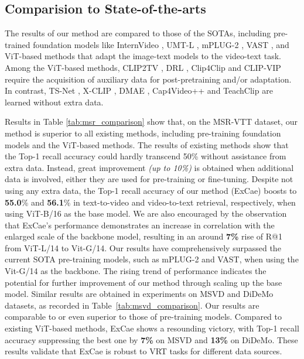 \subsection{Comparision to State-of-the-arts}
The results of our method are compared to those of the SOTAs, including pre-trained foundation models like InternVideo \cite{wang2022internvideo}, UMT-L \cite{li2023unmasked}, mPLUG-2 \cite{xu2023mplug}, VAST \cite{chen2024vast}, and ViT-based methods that adapt the image-text models to the video-text task. Among the ViT-based methods, CLIP2TV \cite{gao2021clip2tv}, DRL \cite{wang2022disentangled}, Clip4Clip \cite{luo2022clip4clip} and CLIP-VIP \cite{xue2022clip} require the acquisition of auxiliary data for post-pretraining and/or adaptation. In contrast, TS-Net \cite{liu2022ts2}, X-CLIP \cite{ma2022x}, DMAE \cite{jiang2023dual}, Cap4Video++ \cite{cap4video++} and TeachClip \cite{holistic} are learned without extra data. 


Results in Table \ref{tab:msr_comparison} show that, on the MSR-VTT dataset, our method is superior to all existing methods, including pre-training foundation models and the ViT-based methods. 
The results of existing methods show that the Top-1 recall accuracy could hardly transcend 50\% without assistance from extra data. Instead, great improvement \textit{(up to 10\%)} is obtained when additional data is involved, either they are used for pre-training or fine-tuning. 
Despite not using any extra data, the Top-1 recall accuracy of our method (ExCae) boosts to \textbf{55.0}\% and \textbf{56.1}\% in text-to-video and video-to-text retrieval, respectively, when using ViT-B/16 as the base model.
We are also encouraged by the observation that ExCae's performance demonstrates an increase in correlation with the enlarged scale of the backbone model, resulting in an around \textbf{7\%} rise of R@1 from ViT-L/14 to Vit-G/14. Our results have comprehensively surpassed the current SOTA pre-training models, such as mPLUG-2 and VAST, when using the Vit-G/14 as the backbone. The rising trend of performance indicates the potential for further improvement of our method through scaling up the base model.
Similar results are obtained in experiments on MSVD and DiDeMo datasets, as recorded in Table~\ref{tab:msvd_comparison}. Our results are comparable to or even superior to those of pre-training models. 
Compared to existing ViT-based methods, ExCae shows a resounding victory, with Top-1 recall accuracy suppressing the best one by \textbf{7\%} on MSVD and \textbf{13\%} on DiDeMo. 
These results validate that ExCae is robust to VRT tasks for different data sources. 

